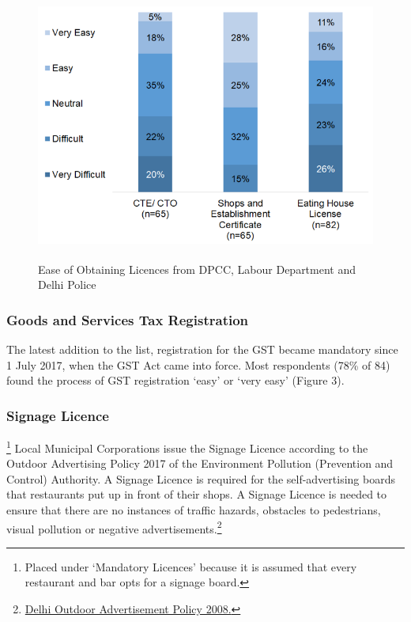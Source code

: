 \documentclass[a4paper, 12pt]{article}
\begin{document}
 			\begin{figure}[H]
                    		\centering
                    		\includegraphics[height = 3.5in]{Figure2.png}
                    		\caption[Optional Caption]{Ease of Obtaining Licences from DPCC, Labour Department and Delhi Police}
			\end{figure}

		\subsubsection{Goods and Services Tax Registration}
		The latest addition to the list, registration for the GST became mandatory since 1 July 2017, when the GST Act came into force. Most respondents (78\% of 84) found the process of GST registration ‘easy’ or ‘very easy’ (Figure 3).
		
		\subsubsection{Signage Licence}\footnote{Placed under ‘Mandatory Licences’ because it is assumed that every restaurant and bar opts for a signage board.}
		Local Municipal Corporations issue the Signage Licence according to the Outdoor Advertising Policy 2017 of the Environment Pollution (Prevention and Control) Authority. A Signage Licence is required for the self-advertising boards that restaurants put 
up in front of their shops. A Signage Licence is needed to ensure that there are no instances of traffic hazards, obstacles to pedestrians, visual pollution or negative advertisements.\footnote{\href{https://bit.ly/2xdiNzk}{Delhi Outdoor Advertisement Policy 2008.}}
		
\end{document}

